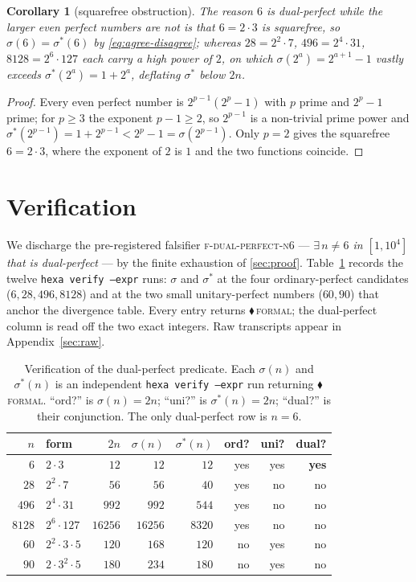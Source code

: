 \documentclass[11pt,a4paper]{article}
\newcommand{\sig}{\sigma}
\newcommand{\sigs}{\sigma^{*}}
\newcommand{\formal}{\textcolor{blue!60!black}{$\blacklozenge$}}
\theoremstyle{plain}
\newtheorem{corollary}{Corollary}
\theoremstyle{definition}
\begin{document}
\begin{corollary}[squarefree obstruction]
\label{cor:sqfree}
The reason $6$ is dual-perfect while the larger even perfect numbers are not is
that $6=2\cdot3$ is \emph{squarefree}, so $\sig(6)=\sigs(6)$ by
\eqref{eq:agree-disagree}; whereas $28=2^2\cdot7$, $496=2^4\cdot31$, $8128=2^6
\cdot127$ each carry a high power of $2$, on which $\sig(2^a)=2^{a+1}-1$ vastly
exceeds $\sigs(2^a)=1+2^a$, deflating $\sigs$ below $2n$.
\end{corollary}
\begin{proof}
Every even perfect number is $2^{p-1}(2^p-1)$ with $p$ prime and $2^p-1$ prime;
for $p\ge3$ the exponent $p-1\ge2$, so $2^{p-1}$ is a non-trivial prime power
and $\sigs(2^{p-1})=1+2^{p-1}<2^p-1=\sig(2^{p-1})$. Only $p=2$ gives the
squarefree $6=2\cdot3$, where the exponent of $2$ is $1$ and the two functions
coincide. \qedhere
\end{proof}

\section{Verification}
\label{sec:verification}

We discharge the pre-registered falsifier \textsc{f-dual-perfect-n6} ---
\emph{$\exists\,n\neq6$ in $[1,10^4]$ that is dual-perfect} --- by the finite
exhaustion of \textsection\ref{sec:proof}. Table~\ref{tab:sweep} records the
twelve \texttt{hexa verify --expr} runs: $\sig$ and $\sigs$ at the four
ordinary-perfect candidates ($6,28,496,8128$) and at the two small
unitary-perfect numbers ($60,90$) that anchor the divergence table. Every entry
returns \formal\,\textsc{formal}; the dual-perfect column is read off the two
exact integers. Raw transcripts appear in Appendix~\ref{sec:raw}.

\begin{table}[h]
\centering
\caption{Verification of the dual-perfect predicate. Each $\sig(n)$ and
$\sigs(n)$ is an independent \texttt{hexa verify --expr} run returning
\formal\,\textsc{formal}. ``ord?'' is $\sig(n)\!=\!2n$; ``uni?'' is
$\sigs(n)\!=\!2n$; ``dual?'' is their conjunction. The only dual-perfect row is
$n=6$.}
\label{tab:sweep}
\begin{tabular}{rl rrr rrr}
\toprule
$n$ & form & $2n$ & $\sig(n)$ & $\sigs(n)$ & ord? & uni? & dual?\\
\midrule
$6$    & $2\cdot3$          & $12$    & $12$    & $12$   & yes & yes & \textbf{yes}\\
$28$   & $2^2\cdot7$        & $56$    & $56$    & $40$   & yes & no  & no\\
$496$  & $2^4\cdot31$       & $992$   & $992$   & $544$  & yes & no  & no\\
$8128$ & $2^6\cdot127$      & $16256$ & $16256$ & $8320$ & yes & no  & no\\
$60$   & $2^2\cdot3\cdot5$  & $120$   & $168$   & $120$  & no  & yes & no\\
$90$   & $2\cdot3^2\cdot5$  & $180$   & $234$   & $180$  & no  & yes & no\\
\bottomrule
\end{tabular}
\end{table}
\end{document}

